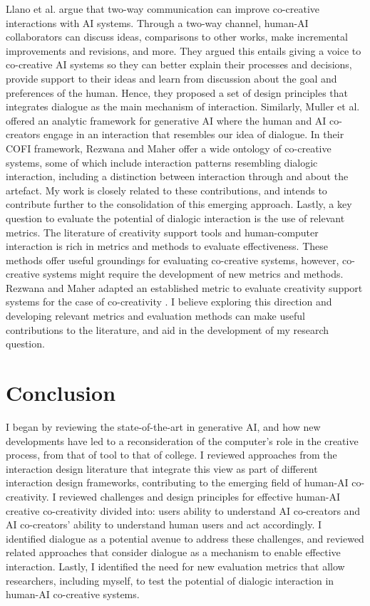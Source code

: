 Llano et al. \cite{Llano2022-ti} argue that two-way communication can improve co-creative interactions with AI systems. Through a two-way channel, human-AI collaborators can discuss ideas, comparisons to other works, make incremental improvements and revisions, and more. They argued this entails giving a voice to co-creative AI systems so they can better explain their processes and decisions, provide support to their ideas and learn from discussion about the goal and preferences of the human. Hence, they proposed a set of design principles that integrates dialogue as the main mechanism of interaction. Similarly, Muller et al. \cite{Muller2020-nv} offered an analytic framework for generative AI where the human and AI co-creators engage in an interaction that resembles our idea of dialogue. In their COFI framework, Rezwana and Maher \cite{Rezwana2022-gg} offer a wide ontology of co-creative systems, some of which include interaction patterns resembling dialogic interaction, including a distinction between interaction through and about the artefact. My work is closely related to these contributions, and intends to contribute further to the consolidation of this emerging approach. Lastly, a key question to evaluate the potential of dialogic interaction is the use of relevant metrics. The literature of creativity support tools and human-computer interaction is rich in metrics and methods to evaluate effectiveness. These methods offer useful groundings for evaluating co-creative systems, however, co-creative systems might require the development of new metrics and methods. Rezwana and Maher adapted an established metric to evaluate creativity support systems for the case of co-creativity \cite{Rezwana2022-ui}. I believe exploring this direction and developing relevant metrics and evaluation methods can make useful contributions to the literature, and aid in the development of my research question. 

\section{Conclusion}

I began by reviewing the state-of-the-art in generative AI, and how new developments have led to a reconsideration of the computer's role in the creative process, from that of tool to that of college. I reviewed approaches from the interaction design literature that integrate this view as part of different interaction design frameworks, contributing to the emerging field of human-AI co-creativity. I reviewed challenges and design principles for effective human-AI creative co-creativity divided into: users ability to understand AI co-creators and AI co-creators' ability to understand human users and act accordingly. I identified dialogue as a potential avenue to address these challenges, and reviewed related approaches that consider dialogue as a mechanism to enable effective interaction. Lastly, I identified the need for new evaluation metrics that allow researchers, including myself, to test the potential of dialogic interaction in human-AI co-creative systems. 




